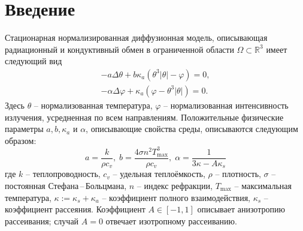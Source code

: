 \documentclass[10pt]{article}
\begin{document}
    \section{Введение}\label{sec:intro}
    Стационарная нормализированная диффузионная модель, описывающая радиационный и кондуктивный
    обмен в ограниченной области $\Omega \subset \mathbb{R}^3$ имеет следующий вид~\cite{modest-rht}
    \begin{equation}
        \label{initial}
        \begin{aligned}
            - a \Delta \theta + b \kappa_a(\theta ^ 3 | \theta | - \varphi) = 0,  \\
            - \alpha \Delta \varphi + \kappa_a (\varphi - \theta ^3 | \theta |) = 0.
        \end{aligned}
    \end{equation}
    Здесь $\theta$ – нормализованная температура,
    $\varphi$ – нормализованная интенсивность излучения, усредненная по всем направлениям.
    Положительные физические параметры $a, b, \kappa_a $ и $\alpha$,
    описывающие свойства среды, описываются следующим образом:
    \[
        a = \frac{k}{\rho c_v}, \; b = \frac{4 \sigma n^2 T^3_{\text{max}}}{\rho c_v}, \;
        \alpha = \frac{1}{3\kappa -A \kappa_s}
    \]
    где $k$ -- теплопроводность, $c_v$ -- удельная теплоёмкость, $\rho$ -- плотность,
    $\sigma$ -- постоянная Стефана\,--\,Больцмана, $n$ -- индекс рефракции,
    $T_{\text{max}}$ -- максимальная температура, $\kappa := \kappa_s + \kappa_a$ -- коэффициент
    полного взаимодействия, $\kappa_s$ -- коэффициент рассеяния.
    Коэффициент $A \in [-1,1]$ описывает анизотропию рассеивания;
    случай $A=0$ отвечает изотропному рассеиванию.
\end{document}
